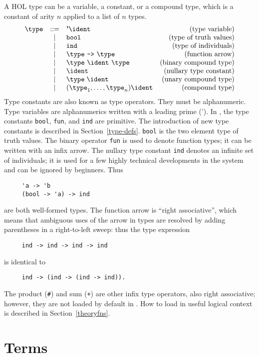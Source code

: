 {A HOL type can be a variable, a constant, or a compound type, which is
a constant of arity $n$ applied to a list of $n$ types.
\[
\begin{array}{rclr}
  \type & ::= & \mbox{\bf '}\ident & \mbox{(type variable)} \\
  & | &  \verb+bool+ & \mbox{(type of truth values)} \\
  & | &  \verb+ind+ & \mbox{(type of individuals)} \\
  & | &  \type\ \verb+->+\ \type & \mbox{(function arrow)} \\
  & | &  \type\ \ident\ \type\ & \mbox{(binary compound type)}\\
  & | &  \ident & \mbox{(nullary type constant)} \\
  & | & \type\; \ident & \mbox{(unary compound type)} \\
  & | & (\type_1,\ldots,\type_n) \ident & \mbox{(compound type)}
\end{array}
\]
Type constants are also known as type operators. They must be
alphanumeric. Type variables are alphanumerics written with a leading
prime ('). In \HOL{}, the type constants {\tt bool}, {\tt fun}, and
{\tt ind} are primitive. The introduction of new type constants is
described in Section~\ref{type-defs}. {\tt bool} is the two element type
of truth values. The binary operator {\tt fun} is used to denote
function types; it can be written with an infix arrow. The nullary
type constant {\tt ind} denotes an infinite set of individuals; it is
used for a few highly technical developments in the system and can be
ignored by beginners.  Thus
\begin{verbatim}
     'a -> 'b
     (bool -> 'a) -> ind
\end{verbatim}
are both well-formed types. The function arrow is ``right associative'',
which means that ambiguous uses of the arrow in types are resolved by
adding parentheses in a right-to-left sweep: thus the type expression
\begin{verbatim}
     ind -> ind -> ind -> ind
\end{verbatim}
is identical to
\begin{verbatim}
     ind -> (ind -> (ind -> ind)).
\end{verbatim}
The product (\verb+#+) and sum (\verb!+!) are other infix type
operators, also right associative; however, they are not loaded by
default in \HOL{}. How to load in useful logical context is described
in Section~\ref{theoryfns}.

\section{Terms}

}
